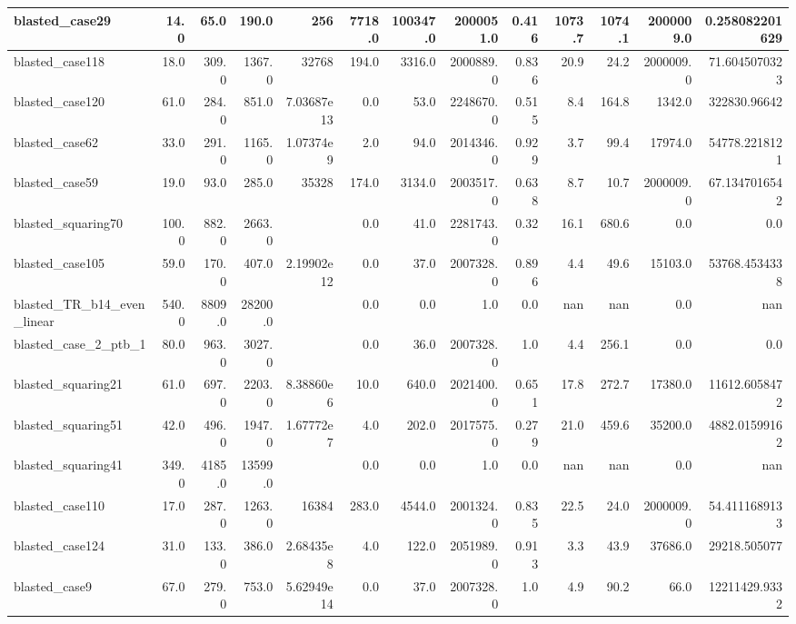\begin{tabular}{|l r r r r| r r r r r r | r r|}
\hline
blasted\_case29 & 14.0 & 65.0 & 190.0 & 256 & 7718.0 & 100347.0 & 2000051.0 & 0.416 & 1073.7 & 1074.1 & 2000009.0 & 0.258082201629 \\
\hline
blasted\_case118 & 18.0 & 309.0 & 1367.0 & 32768 & 194.0 & 3316.0 & 2000889.0 & 0.836 & 20.9 & 24.2 & 2000009.0 & 71.6045070323 \\
\hline
blasted\_case120 & 61.0 & 284.0 & 851.0 & 7.03687e13 & 0.0 & 53.0 & 2248670.0 & 0.515 & 8.4 & 164.8 & 1342.0 & 322830.96642 \\
\hline
blasted\_case62 & 33.0 & 291.0 & 1165.0 & 1.07374e9 & 2.0 & 94.0 & 2014346.0 & 0.929 & 3.7 & 99.4 & 17974.0 & 54778.2218121 \\
\hline
blasted\_case59 & 19.0 & 93.0 & 285.0 & 35328 & 174.0 & 3134.0 & 2003517.0 & 0.638 & 8.7 & 10.7 & 2000009.0 & 67.1347016542 \\
\hline
blasted\_squaring70 & 100.0 & 882.0 & 2663.0 &  & 0.0 & 41.0 & 2281743.0 & 0.32 & 16.1 & 680.6 & 0.0 & 0.0 \\
\hline
blasted\_case105 & 59.0 & 170.0 & 407.0 & 2.19902e12 & 0.0 & 37.0 & 2007328.0 & 0.896 & 4.4 & 49.6 & 15103.0 & 53768.4534338 \\
\hline
blasted\_TR\_b14\_even\_linear & 540.0 & 8809.0 & 28200.0 &  & 0.0 & 0.0 & 1.0 & 0.0 & nan & nan & 0.0 & nan \\
\hline
blasted\_case\_2\_ptb\_1 & 80.0 & 963.0 & 3027.0 &  & 0.0 & 36.0 & 2007328.0 & 1.0 & 4.4 & 256.1 & 0.0 & 0.0 \\
\hline
blasted\_squaring21 & 61.0 & 697.0 & 2203.0 & 8.38860e6 & 10.0 & 640.0 & 2021400.0 & 0.651 & 17.8 & 272.7 & 17380.0 & 11612.6058472 \\
\hline
blasted\_squaring51 & 42.0 & 496.0 & 1947.0 & 1.67772e7 & 4.0 & 202.0 & 2017575.0 & 0.279 & 21.0 & 459.6 & 35200.0 & 4882.01599162 \\
\hline
blasted\_squaring41 & 349.0 & 4185.0 & 13599.0 &  & 0.0 & 0.0 & 1.0 & 0.0 & nan & nan & 0.0 & nan \\
\hline
blasted\_case110 & 17.0 & 287.0 & 1263.0 & 16384 & 283.0 & 4544.0 & 2001324.0 & 0.835 & 22.5 & 24.0 & 2000009.0 & 54.4111689133 \\
\hline
blasted\_case124 & 31.0 & 133.0 & 386.0 & 2.68435e8 & 4.0 & 122.0 & 2051989.0 & 0.913 & 3.3 & 43.9 & 37686.0 & 29218.505077 \\
\hline
blasted\_case9 & 67.0 & 279.0 & 753.0 & 5.62949e14 & 0.0 & 37.0 & 2007328.0 & 1.0 & 4.9 & 90.2 & 66.0 & 12211429.9332 \\
\hline
\end{tabular}